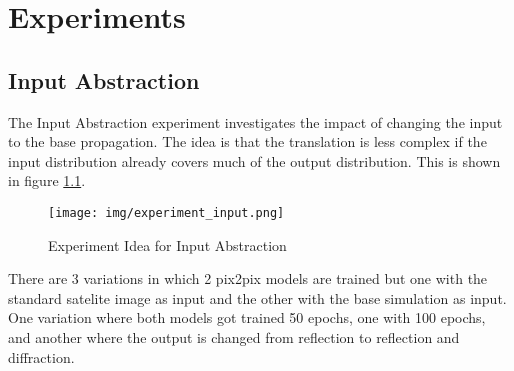 \chapter{Experiments}
\label{cha:experiments}



	\section{Input Abstraction}
	\label{sec:experiments-input-abstraction}
		The Input Abstraction experiment investigates the impact of changing the input to the base propagation. The idea is that the translation is less complex if the input distribution already covers much of the output distribution. This is shown in figure \ref{fig:experiment_input}.
		\begin{figure}[H]
			\centering
			\texttt{[image: img/experiment\_input.png]}
			\caption[Experiment Idea for Input Abstraction]{Experiment Idea for Input Abstraction}
			\label{fig:experiment_input}
		\end{figure}
		\FloatBarrier
		There are 3 variations in which 2 pix2pix models are trained but one with the standard satelite image as input and the other with the base simulation as input. One variation where both models got trained 50 epochs, one with 100 epochs, and another where the output is changed from reflection to reflection and diffraction.
		
